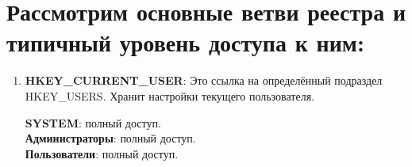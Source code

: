 \documentclass[a4paper, 14pt]{report}
\begin{document}
\section{Рассмотрим основные ветви реестра и типичный уровень доступа к ним:}
\begin{enumerate}
    \item {\textbf{HKEY\_CURRENT\_USER}: Это ссылка на определённый подраздел HKEY\_USERS. Хранит настройки текущего пользователя.
          \begin{tcolorbox}[colback=white!95!gray, colframe=black, title=Права доступа]
              \textbf{SYSTEM}: полный доступ.\\
              \textbf{Администраторы}: полный доступ.\\
              \textbf{Пользователи}: полный доступ.
          \end{tcolorbox}

}
\end{enumerate}
\end{document}
